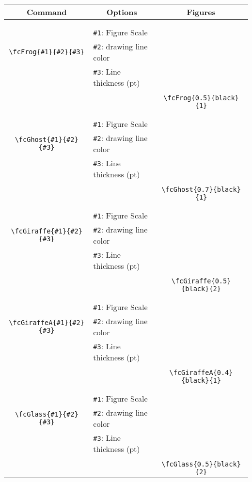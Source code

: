 \documentclass{article}
\begin{document}
\begin{table}[H]\centering\begin{tabular}{|c|l|c|}\hline {\bf Command}& \multicolumn{1}{c|}{{\bf Options}} & {\bf Figures}\\  \hline	&&\multirow{5}{*}{\fcFrog{0.5}{black}{1}}\\	&&\\	&\verb|#1|: Figure Scale &\\	\verb|\fcFrog{#1}{#2}{#3}|&	\verb|#2|: drawing line color &\\	&\verb|#3|: Line thickness (pt) &\\ &&\\&&	\verb|\fcFrog{0.5}{black}{1}|\\\hline 	
	&&\multirow{5}{*}{\fcGhost{0.7}{black}{1}}\\	&&\\	&\verb|#1|: Figure Scale &\\	\verb|\fcGhost{#1}{#2}{#3}|&	\verb|#2|: drawing line color &\\	&\verb|#3|: Line thickness (pt) &\\ &&\\&&	\verb|\fcGhost{0.7}{black}{1}|\\\hline 	
	&&\multirow{5}{*}{\fcGiraffe{0.5}{black}{2}}\\	&&\\	&\verb|#1|: Figure Scale &\\	\verb|\fcGiraffe{#1}{#2}{#3}|&	\verb|#2|: drawing line color &\\	&\verb|#3|: Line thickness (pt) &\\ &&\\&&	\verb|\fcGiraffe{0.5}{black}{2}|\\\hline 	
	&&\multirow{5}{*}{\fcGiraffeA{0.4}{black}{1}}\\	&&\\	&\verb|#1|: Figure Scale &\\	\verb|\fcGiraffeA{#1}{#2}{#3}|&	\verb|#2|: drawing line color &\\	&\verb|#3|: Line thickness (pt) &\\ &&\\&&	\verb|\fcGiraffeA{0.4}{black}{1}|\\\hline 	
	&&\multirow{5}{*}{\fcGlass{0.5}{black}{2}}\\	&&\\	&\verb|#1|: Figure Scale &\\	\verb|\fcGlass{#1}{#2}{#3}|&	\verb|#2|: drawing line color &\\	&\verb|#3|: Line thickness (pt) &\\ &&\\&&	\verb|\fcGlass{0.5}{black}{2}|\\\hline 	

\end{tabular}
\end{table}
\end{document}
